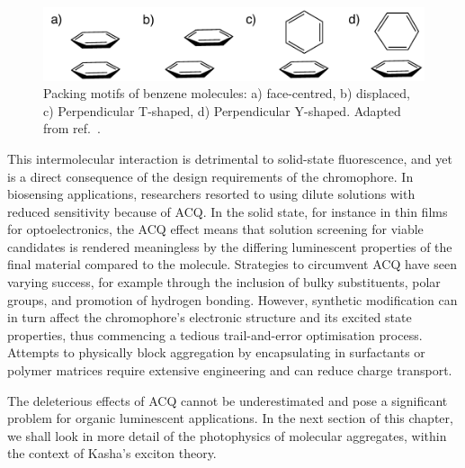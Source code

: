 \begin{figure}[H]
\centering
  \includegraphics[width=0.7\linewidth]{1Intro/Stacking.pdf}
  \caption[Stacking motifs of benzene]{Packing motifs of benzene molecules: a) face-centred, b) displaced, c) Perpendicular T-shaped, d) Perpendicular Y-shaped. Adapted from ref.~.}
  \label{figure: Benzene_Stacking}
\end{figure}

This intermolecular interaction is detrimental to solid-state fluorescence, and yet is a direct consequence of the design requirements of the chromophore. In biosensing applications, researchers resorted to using dilute solutions with reduced sensitivity because of \ac{ACQ}.\cite{Thomas2007,Kwok2015} In the solid state, for instance in thin films for optoelectronics, the \ac{ACQ} effect means that solution screening for viable candidates is rendered meaningless by the differing luminescent properties of the final material compared to the molecule. Strategies to circumvent \ac{ACQ} have seen varying success, for example through the inclusion of bulky substituents, polar groups, and promotion of hydrogen bonding.\cite{Hong2009,Zhang2013,Mei2014,Mei2015} However, synthetic modification can in turn affect the chromophore's electronic structure and its excited state properties, thus commencing a tedious trail-and-error optimisation process. Attempts to physically block aggregation by encapsulating in surfactants or polymer matrices require extensive engineering and can reduce charge transport.\cite{Hong2009,Chen2000,Lee2013} 

The deleterious effects of \ac{ACQ} cannot be underestimated and pose a significant problem for organic luminescent applications. In the next section of this chapter, we shall look in more detail of the photophysics of molecular aggregates, within the context of Kasha's exciton theory.
